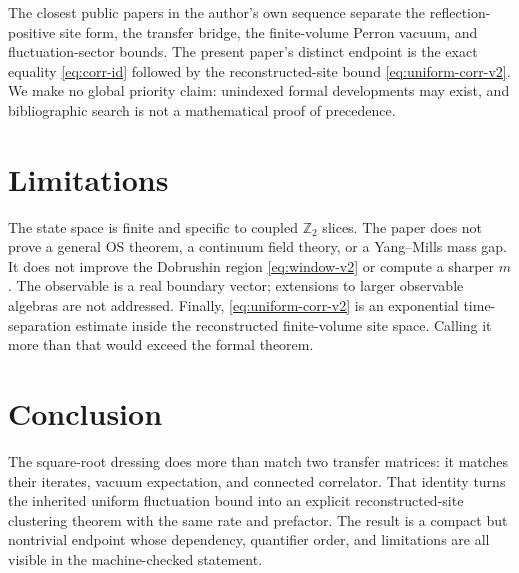 \documentclass[11pt]{article}
\begin{document}
The closest public papers in the author's own sequence separate the
reflection-positive site form, the transfer bridge, the finite-volume Perron
vacuum, and fluctuation-sector bounds.  The present paper's distinct endpoint
is the exact equality \eqref{eq:corr-id} followed by the reconstructed-site
bound \eqref{eq:uniform-corr-v2}.  We make no global priority claim: unindexed
formal developments may exist, and bibliographic search is not a mathematical
proof of precedence.

\section{Limitations}

The state space is finite and specific to coupled $\mathbb Z_2$ slices.  The
paper does not prove a general OS theorem, a continuum field theory, or a
Yang--Mills mass gap.  It does not improve the Dobrushin region
\eqref{eq:window-v2} or compute a sharper $m$.  The observable is a real
boundary vector; extensions to larger observable algebras are not addressed.
Finally, \eqref{eq:uniform-corr-v2} is an exponential time-separation estimate
inside the reconstructed finite-volume site space.  Calling it more than that
would exceed the formal theorem.

\section{Conclusion}

The square-root dressing does more than match two transfer matrices: it
matches their iterates, vacuum expectation, and connected correlator.  That
identity turns the inherited uniform fluctuation bound into an explicit
reconstructed-site clustering theorem with the same rate and prefactor.  The
result is a compact but nontrivial endpoint whose dependency, quantifier order,
and limitations are all visible in the machine-checked statement.
\end{document}
